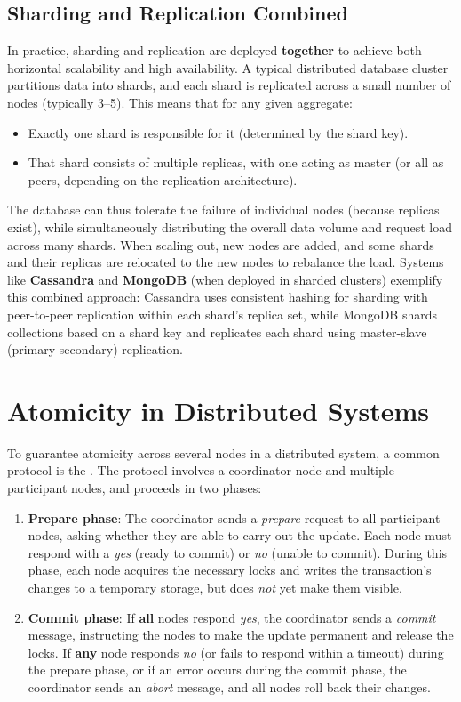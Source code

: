 \subsection{Sharding and Replication Combined}
In practice, sharding and replication are deployed \textbf{together} to achieve both horizontal scalability and high availability. A typical distributed database cluster partitions data into shards, and each shard is replicated across a small number of nodes (typically 3--5). This means that for any given aggregate:
\begin{itemize}
    \item Exactly one shard is responsible for it (determined by the shard key).
    \item That shard consists of multiple replicas, with one acting as master (or all as peers, depending on the replication architecture).
\end{itemize}
The database can thus tolerate the failure of individual nodes (because replicas exist), while simultaneously distributing the overall data volume and request load across many shards. When scaling out, new nodes are added, and some shards and their replicas are relocated to the new nodes to rebalance the load. Systems like \textbf{Cassandra} and \textbf{MongoDB} (when deployed in sharded clusters) exemplify this combined approach: Cassandra uses consistent hashing for sharding with peer-to-peer replication within each shard's replica set, while MongoDB shards collections based on a shard key and replicates each shard using master-slave (primary-secondary) replication.

\section{Atomicity in Distributed Systems}
To guarantee atomicity across several nodes in a distributed system, a common protocol is the  \cite{kleppmann2017ddia}. The protocol involves a coordinator node and multiple participant nodes, and proceeds in two phases:

\begin{enumerate}
    \item \textbf{Prepare phase}: The coordinator sends a \emph{prepare} request to all participant nodes, asking whether they are able to carry out the update. Each node must respond with a \emph{yes} (ready to commit) or \emph{no} (unable to commit). During this phase, each node acquires the necessary locks and writes the transaction's changes to a temporary storage, but does \emph{not} yet make them visible.
    \item \textbf{Commit phase}: If \textbf{all} nodes respond \emph{yes}, the coordinator sends a \emph{commit} message, instructing the nodes to make the update permanent and release the locks. If \textbf{any} node responds \emph{no} (or fails to respond within a timeout) during the prepare phase, or if an error occurs during the commit phase, the coordinator sends an \emph{abort} message, and all nodes roll back their changes.
\end{enumerate}

